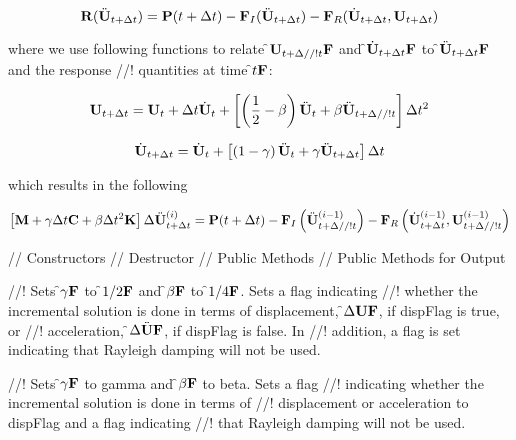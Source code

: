 \[ {\bf R} (\ddot{\bf U}_{t + \Delta t}) = {\bf P}(t + \Delta t) - {\bf F}_I(\ddot{\bf U}_{t+\Delta t})
- {\bf F}_R(\dot{\bf U}_{t + \Delta t},{\bf U}_{t + \Delta t}) \]

\noindent where we use following functions to relate \f${\bf U}_{t + \Delta
//! t}{\bf F}$ and \f$\dot{\bf U}_{t + \Delta t}{\bf F}$ to \f$\ddot{\bf U}_{t + \Delta t}{\bf F}$ and the response
//! quantities at time \f$t{\bf F}$:

\[
{\bf U}_{t + \Delta t} = {\bf U}_t + \Delta t \dot{\bf U}_t + \left[
\left(\frac{1}{2} - \beta\right)\ddot{\bf U}_t + \beta \ddot{\bf U}_{t + \Delta
//! t}\right] \Delta t^2
\]

\[
\dot{\bf U}_{t + \Delta t} = \dot{\bf U}_t + \left[ \left(1 - \gamma\right)\ddot{\bf U}_t +
\gamma\ddot{\bf U}_{t + \Delta t}\right] \Delta t
\]

\noindent which results in the following 

\[ \left[ {\bf M} + \gamma \Delta t {\bf C} + \beta \Delta t^2 {\bf K} \right] \Delta
\ddot{\bf U}_{t + \Delta t}^{(i)} = {\bf P}(t + \Delta t) - {\bf F}_I\left(\ddot{\bf U}_{t+\Delta 
//! t}^{(i-1)}\right)
- {\bf F}_R\left(\dot{\bf U}_{t + \Delta t}^{(i-1)},{\bf U}_{t + \Delta
//! t}^{(i-1)}\right) \]


\pagebreak
{}
\indent // Constructors
\indent // Destructor
\indent // Public Methods
\indent // Public Methods for Output


//! Sets \f$\gamma{\bf F}$ to \f$1/2{\bf F}$ and \f$\beta{\bf F}$ to \f$1/4{\bf F}$. Sets a flag indicating
//! whether the incremental solution is done in terms of displacement,
\f$\Delta {\bf U}{\bf F}$, if \p dispFlag is \p true, or  
//! acceleration, \f$\Delta \ddot {{\bf U}}{\bf F}$, if \p dispFlag is \p false. In
//! addition, a flag is set indicating that Rayleigh damping will not be used.


//! Sets \f$\gamma{\bf F}$ to \p gamma and \f$\beta{\bf F}$ to \p beta. Sets a flag
//! indicating whether the incremental solution is done in terms of
//! displacement or acceleration to \p dispFlag and a flag indicating
//! that Rayleigh damping will not be used.


